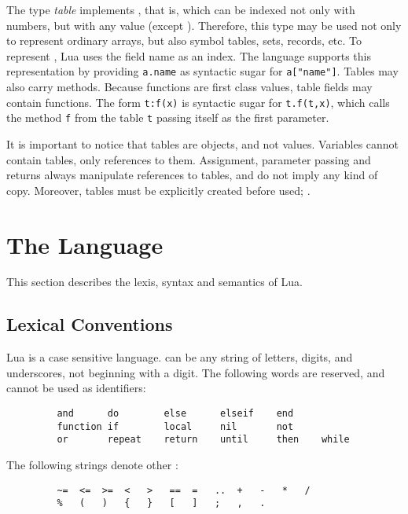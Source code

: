 The type {\em table} implements ,
that is,  which can be indexed not only with numbers,
but with any value (except \nil).
Therefore, this type may be used not only to represent ordinary arrays,
but also symbol tables, sets, records, etc.
To represent , Lua uses the field name as an index.
The language supports this representation by
providing \verb'a.name' as syntactic sugar for \verb'a["name"]'.
Tables may also carry methods.
Because functions are first class values,
table fields may contain functions.
The form \verb't:f(x)' is syntactic sugar for \verb't.f(t,x)',
which calls the method \verb'f' from the table \verb't' passing
itself as the first parameter.

It is important to notice that tables are objects, and not values.
Variables cannot contain tables, only references to them.
Assignment, parameter passing and returns always manipulate references
to tables, and do not imply any kind of copy.
Moreover, tables must be explicitly created before used;
.



\section{The Language}

This section describes the lexis, syntax and semantics of Lua.


\subsection{Lexical Conventions} \label{lexical}

Lua is a case sensitive language.
 can be any string of letters, digits, and underscores,
not beginning with a digit.
The following words are reserved, and cannot be used as identifiers:
\begin{verbatim}
         and      do        else      elseif    end
         function if        local     nil       not
         or       repeat    return    until     then    while
\end{verbatim}

The following strings denote other :
\begin{verbatim}
         ~=  <=  >=  <   >   ==  =   ..  +   -   *   /
         %   (   )   {   }   [   ]   ;   ,   .
\end{verbatim}

